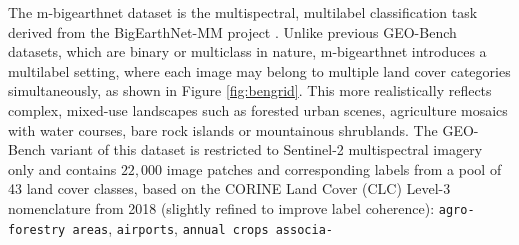 \documentclass[a4paper, twoside, english]{sapthesis} %
\begin{document}
The m-bigearthnet dataset is the multispectral, multilabel classification task derived from the BigEarthNet-MM project \cite{sumbul2021bigearthnet}. Unlike previous GEO-Bench datasets, which are binary or multiclass in nature, m-bigearthnet introduces a multilabel setting, where each image may belong to multiple land cover categories simultaneously, as shown in Figure \ref{fig:bengrid}. This more realistically reflects complex, mixed-use landscapes such as forested urban scenes, agriculture mosaics with water courses, bare rock islands or mountainous shrublands.
The GEO-Bench variant of this dataset is restricted to Sentinel-2 multispectral imagery only and contains $22,000$ image patches and corresponding labels from a pool of 43 land cover classes, based on the CORINE Land Cover (CLC) Level-3 nomenclature from 2018 (slightly refined to improve label coherence): \texttt{agro-forestry areas}, \texttt{airports}, \texttt{annual crops associa-}\\
\end{document}
